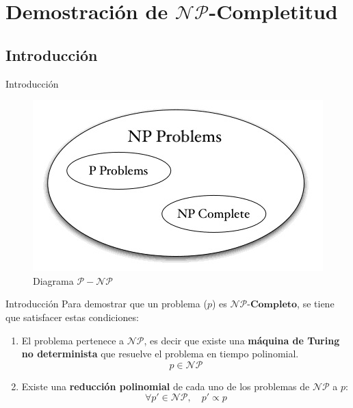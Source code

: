 \documentclass{beamer}
\begin{document}
\section{Demostración de $\mathcal{NP}$-Completitud}
\subsection{Introducción}

\begin{frame}{Introducción}
    \begin{figure}
        \centering
        \includegraphics[scale=0.7]{images/p-np.jpg}
        \caption{Diagrama $\mathcal{P} - \mathcal{NP}$}
    \end{figure}
\end{frame}

\begin{frame}{Introducción}
    Para demostrar que un problema ($p$) es $\mathcal{NP}\textbf{-Completo}$, se tiene que satisfacer estas condiciones:
    \vfill
    \begin{enumerate}[I]
        \item El problema pertenece a $\mathcal{NP}$, es decir que existe una \textbf{máquina de Turing no determinista} que resuelve el problema en tiempo polinomial.
        \[p \in \mathcal{NP}\]
        \item Existe una \textbf{reducción polinomial} de cada uno de los problemas de $\mathcal{NP}$
        a $p$:
        \[\forall p' \in \mathcal{NP}, \quad p' \propto p\]
    \end{enumerate}
\end{frame}
\end{document}
